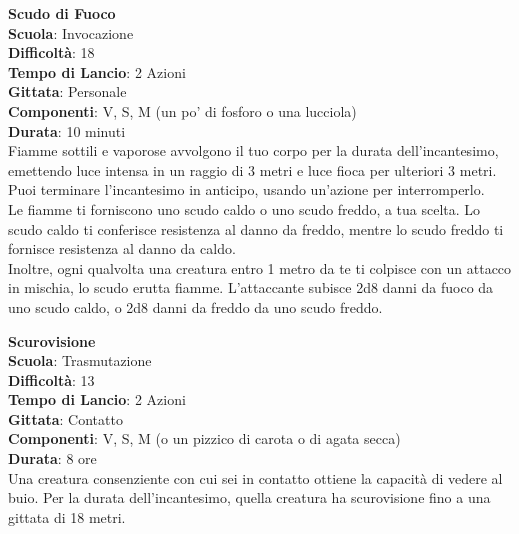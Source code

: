 \begin{multicols}{2}
\medskip\textbf{Scudo di Fuoco}\\
\textbf{Scuola}: Invocazione\\
\textbf{Difficoltà}: 18\\
\textbf{Tempo di Lancio}: 2 Azioni\\
\textbf{Gittata}: Personale\\
\textbf{Componenti}: V, S, M (un po' di fosforo o una lucciola) \\
\textbf{Durata}: 10 minuti\\
Fiamme sottili e vaporose avvolgono il tuo corpo per la durata dell'incantesimo, emettendo luce intensa in un raggio di 3 metri e luce fioca per ulteriori 3 metri. Puoi terminare l'incantesimo in anticipo, usando un'azione per interromperlo.\\
Le fiamme ti forniscono uno scudo caldo o uno scudo freddo, a tua scelta. Lo scudo caldo ti conferisce resistenza al danno da freddo, mentre lo scudo freddo ti fornisce resistenza al danno da caldo.\\
Inoltre, ogni qualvolta una creatura entro 1 metro da te ti colpisce con un attacco in mischia, lo scudo erutta fiamme. L'attaccante subisce 2d8 danni da fuoco da uno scudo caldo, o 2d8 danni da freddo da uno scudo freddo.

\medskip\textbf{Scurovisione}\\
\textbf{Scuola}: Trasmutazione\\
\textbf{Difficoltà}: 13\\
\textbf{Tempo di Lancio}: 2 Azioni\\
\textbf{Gittata}: Contatto\\
\textbf{Componenti}: V, S, M (o un pizzico di carota o di agata secca)\\
\textbf{Durata}: 8 ore\\
Una creatura consenziente con cui sei in contatto ottiene la capacità di vedere al buio. Per la durata dell'incantesimo, quella creatura ha scurovisione fino a una gittata di 18 metri.


\end{multicols}
